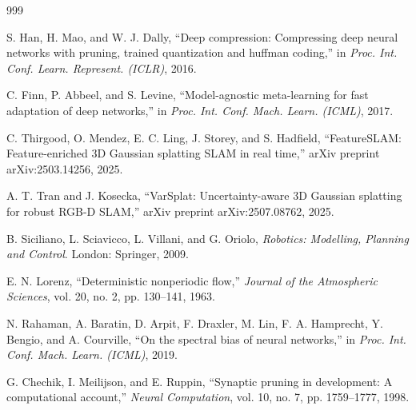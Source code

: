 \documentclass[12pt,a4paper,oneside]{report}
\begin{document}
\begin{thebibliography}{999}

S. Han, H. Mao, and W. J. Dally, ``Deep compression: Compressing deep neural networks with pruning, trained quantization and huffman coding,'' in \textit{Proc. Int. Conf. Learn. Represent. (ICLR)}, 2016.




C. Finn, P. Abbeel, and S. Levine, ``Model-agnostic meta-learning for fast adaptation of deep networks,'' in \textit{Proc. Int. Conf. Mach. Learn. (ICML)}, 2017.




C. Thirgood, O. Mendez, E. C. Ling, J. Storey, and S. Hadfield, ``{FeatureSLAM}: Feature-enriched {3D} Gaussian splatting {SLAM} in real time,'' arXiv preprint arXiv:2503.14256, 2025.




A. T. Tran and J. Kosecka, ``{VarSplat}: Uncertainty-aware {3D} Gaussian splatting for robust {RGB-D} {SLAM},'' arXiv preprint arXiv:2507.08762, 2025.




B. Siciliano, L. Sciavicco, L. Villani, and G. Oriolo, \textit{Robotics: Modelling, Planning and Control}. London: Springer, 2009.




E. N. Lorenz, ``Deterministic nonperiodic flow,'' \textit{Journal of the Atmospheric Sciences}, vol. 20, no. 2, pp. 130--141, 1963.




N. Rahaman, A. Baratin, D. Arpit, F. Draxler, M. Lin, F. A. Hamprecht, Y. Bengio, and A. Courville, ``On the spectral bias of neural networks,'' in \textit{Proc. Int. Conf. Mach. Learn. (ICML)}, 2019.




G. Chechik, I. Meilijson, and E. Ruppin, ``Synaptic pruning in development: A computational account,'' \textit{Neural Computation}, vol. 10, no. 7, pp. 1759--1777, 1998.



\end{thebibliography}
\end{document}
